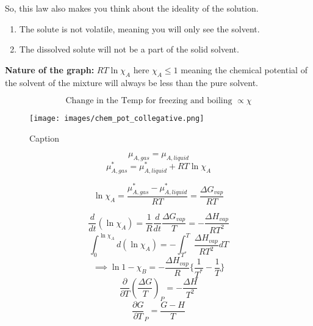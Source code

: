 \documentclass{article}
\theoremstyle{definition}
\begin{document}
So, this law also makes you think about the ideality of the solution.

\begin{enumerate}
    \item The solute is not volatile, meaning you will only see the solvent.
    \item The dissolved solute will not be a part of the solid solvent.
\end{enumerate}




\textbf{Nature of the graph:} $RT\ln{\chi_A}$ here $\chi_A \leq 1$ meaning the chemical potential of the solvent of the mixture will always be less than the pure solvent.

\[
\text{Change in the Temp for freezing and boiling } \propto \chi
\]

\begin{figure}
    \centering
    \texttt{[image: images/chem\_pot\_collegative.png]}
    \caption{Caption}
    \label{fig:enter-label}
\end{figure}

\[
\mu_{A,gas} = \mu_{A, liquid}
\]
\[
\mu_{A,gas}^* = \mu_{A,liquid}^* + RT\ln{\chi_A}
\]

\[
\ln{\chi_A} = \frac{\mu_{A,gas}^* - \mu_{A,liquid}^*}{RT} = \frac{\Delta G_{vap}}{RT}
\]

\[
\frac{d}{dt}(\ln{\chi_A}) = \frac{1}{R} \frac{d}{dt} \frac{\Delta G_{vap}}{T} = - \frac{\Delta H_{vap}}{RT^2}
\]
\[
\int_0^{\ln{\chi_A}} d(\ln{\chi_A}) = - \int_{T^*}^{T} \frac{\Delta H_{vap}}{RT^2} dT
\]
\[
\implies \ln{1-\chi_B} =  -\frac{\Delta H_{vap}}{R}\{\frac{1}{T^*}- \frac{1}{T}\}
\]
\[
\frac{\partial }{\partial T}(\frac{\Delta G}{T})_P = - \frac{\Delta H}{T^2}
\]
\[
\frac{\partial G}{\partial T}_P = \frac{G-H}{T}
\]
\end{document}
